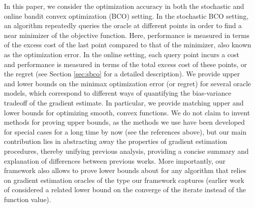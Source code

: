 
In this paper, we consider the optimization accuracy in both the stochastic and online bandit convex optimization (BCO) setting.
In the stochastic BCO setting, an algorithm repeatedly queries the oracle at different points in order to find a near minimizer of the objective function. Here, performance is measured in terms of the excess cost of the last point compared to  that of the minimizer,
also known as the optimization error. In the online setting, each query point incurs a cost and performance is measured
in terms of the total excess cost of these points, or the regret
 (see Section \ref{sec:sbco} for a detailed description).
We  provide upper and lower bounds on the minimax optimization error (or regret) for several oracle models, which correspond to different ways of quantifying the bias-variance tradeoff of the gradient estimate. In particular, we provide matching upper and lower bounds for optimizing smooth, convex functions. We do not claim to invent methods for proving upper bounds, as the methods we use have been developed for special cases for a long time by now (see the references above),
but our main contribution lies in abstracting away the properties of gradient estimation procedures, 
thereby unifying previous analysis, providing a concise summary and explanation of differences between previous works.
More importantly, our framework also allows to prove lower bounds about for any algorithm that relies on gradient
estimation oracles of the type our framework captures
(earlier work of \citet{Chen88:LB-AoS} considered a related lower bound on the converge of the iterate instead of the function value).

